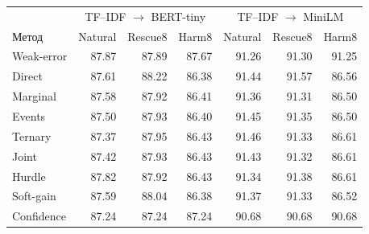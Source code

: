 \begin{tabular}{lrrrrrr}
\toprule
 & \multicolumn{3}{c}{TF--IDF $\to$ BERT-tiny} & \multicolumn{3}{c}{TF--IDF $\to$ MiniLM} \\
Метод & Natural & Rescue8 & Harm8 & Natural & Rescue8 & Harm8 \\
\midrule
Weak-error & 87.87 & 87.89 & 87.67 & 91.26 & 91.30 & 91.25 \\
Direct & 87.61 & 88.22 & 86.38 & 91.44 & 91.57 & 86.56 \\
Marginal & 87.58 & 87.92 & 86.41 & 91.36 & 91.31 & 86.50 \\
Events & 87.50 & 87.93 & 86.40 & 91.45 & 91.35 & 86.50 \\
Ternary & 87.37 & 87.95 & 86.43 & 91.46 & 91.33 & 86.61 \\
Joint & 87.42 & 87.93 & 86.43 & 91.43 & 91.32 & 86.61 \\
Hurdle & 87.82 & 87.92 & 86.43 & 91.34 & 91.38 & 86.61 \\
Soft-gain & 87.59 & 88.04 & 86.38 & 91.37 & 91.33 & 86.52 \\
Confidence & 87.24 & 87.24 & 87.24 & 90.68 & 90.68 & 90.68 \\
\bottomrule
\end{tabular}
